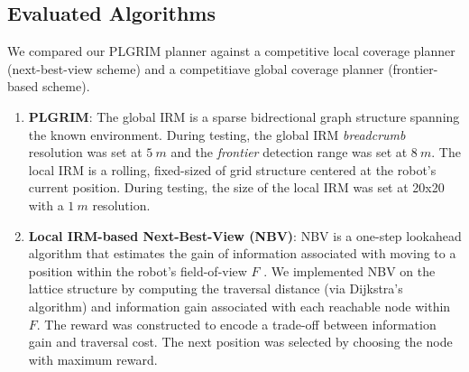 \documentclass[letterpaper]{article} %
\newcommand{\ph}[1]{{\textbf{#1}:}} %
\begin{document}
\subsection{Evaluated Algorithms}
We compared our PLGRIM planner against a competitive local coverage planner (next-best-view scheme) and a competitiave global coverage planner (frontier-based scheme). 
\begin{enumerate}
    \item \ph{PLGRIM}
    The global IRM is a sparse bidrectional graph structure spanning the known environment. During testing, the global IRM \textit{breadcrumb} resolution was set at $5~m$ and the \textit{frontier} detection range was set at $8~m$. The local IRM is a rolling, fixed-sized of grid structure centered at the robot's current position. During testing, the size of the local IRM was set at 20x20 with a $1~m$ resolution.
    
    \item \ph{Local IRM-based Next-Best-View (NBV)} NBV is a one-step lookahead algorithm that estimates the gain of information associated with moving to a position within the robot's field-of-view $F$ \cite{bircher2016receding}. We implemented NBV on the lattice structure by computing the traversal distance (via Dijkstra's algorithm) and information gain associated with each reachable node within $F$. The reward was constructed to encode a trade-off between information gain and traversal cost. The next position was selected by choosing the node with maximum reward. 
    

\end{enumerate}
\end{document}
